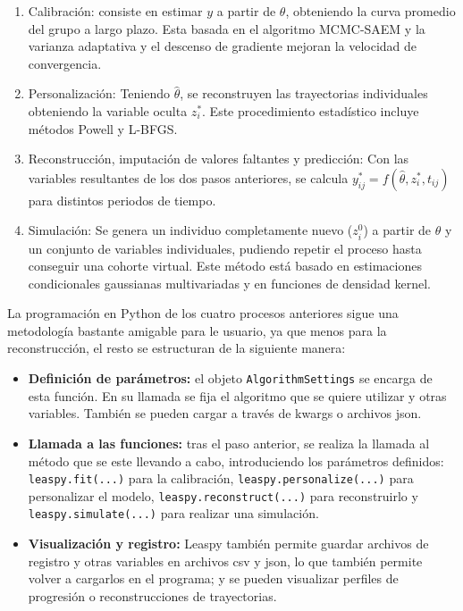\begin{enumerate}
	\item Calibración: consiste en estimar $y$ a partir de $\theta$, obteniendo la curva promedio del grupo a largo plazo. Esta basada en el algoritmo MCMC-SAEM y la varianza adaptativa y el descenso de gradiente mejoran la velocidad de convergencia.
	\item Personalización: Teniendo $\hat{\theta}$, se reconstruyen las trayectorias individuales obteniendo la variable oculta $z_{i}^{*}$. Este procedimiento estadístico incluye métodos Powell y L-BFGS.
	\item Reconstrucción, imputación de valores faltantes y predicción: Con las variables resultantes de los dos pasos anteriores, se calcula $y_{ij}^{*}=f(\hat{\theta}, z_{i}^{*}, t_{ij})$ para distintos periodos de tiempo.
	\item Simulación: Se genera un individuo completamente nuevo ($z_{i}^{0}$) a partir de $\hat{\theta}$ y un conjunto de variables individuales, pudiendo repetir el proceso hasta conseguir una cohorte virtual. Este método está basado en estimaciones condicionales gaussianas multivariadas y en funciones de densidad kernel.	
\end{enumerate}

La programación en Python de los cuatro procesos anteriores sigue una metodología bastante amigable para le usuario, ya que menos para la reconstrucción, el resto se estructuran de la siguiente manera:
\begin{itemize}
	\item \textbf{Definición de parámetros:} el objeto \texttt{AlgorithmSettings} se encarga de esta función. En su llamada se fija el algoritmo que se quiere utilizar y otras variables. También se pueden cargar a través de kwargs o archivos json.
	\item \textbf{Llamada a las funciones:} tras el paso anterior, se realiza la llamada al método que se este llevando a cabo, introduciendo los parámetros definidos: \texttt{leaspy.fit(...)} para la calibración, \texttt{leaspy.personalize(...)} para personalizar el modelo, \texttt{leaspy.reconstruct(...)} para reconstruirlo y\\\texttt{leaspy.simulate(...)} para realizar una simulación.
	\item \textbf{Visualización y registro:} Leaspy también permite guardar archivos de registro y otras variables en archivos csv y json, lo que también permite volver a cargarlos en el programa; y se pueden visualizar perfiles de progresión o reconstrucciones de trayectorias.
\end{itemize}

